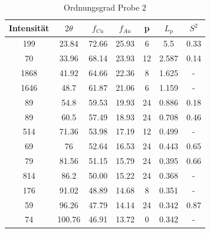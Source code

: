                 \begin{table}[H]
                    \centering
                    \begin{tabular}{c | c | c | c | c | c | c}
                        Intensität & $2\theta$ & $f_{Cu}$ & $f_{Au}$ & p & $L_p$ & $S^2$\\
                        \hline
                        199 & 23.84 & 72.66 & 25.93 & 6 & 5.5 & 0.33\\
                        70 & 33.96 & 68.14 & 23.93 & 12 & 2.587 & 0.14\\
                        1868 & 41.92 & 64.66 & 22.36 & 8 & 1.625 & -\\
                        1646 & 48.7 & 61.87 & 21.06 & 6 & 1.159 & -\\
                        89 & 54.8 & 59.53 & 19.93 & 24 & 0.886 & 0.18\\
                        89 & 60.5 & 57.49 & 18.93 & 24 & 0.708 & 0.46\\
                        514 & 71.36 & 53.98 & 17.19 & 12 & 0.499 & -\\
                        69 & 76 & 52.64 & 16.53 & 24 & 0.443 & 0.65\\
                        79 & 81.56 & 51.15 & 15.79 & 24 & 0.395 & 0.66\\
                        814 & 86.2 & 50.00 & 15.22 & 24 & 0.368 & -\\
                        176 & 91.02 & 48.89 & 14.68 & 8 & 0.351 & -\\
                        59 & 96.26 & 47.79 & 14.14 & 24 & 0.342 & 0.87\\
                        74 & 100.76 & 46.91 & 13.72 & 0 & 0.342 & -\\
                    \end{tabular}
                    \caption{Ordnungsgrad Probe 2}
                \end{table}

